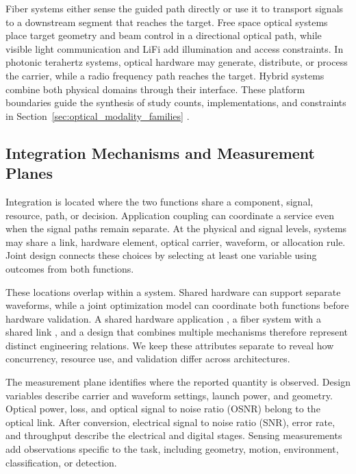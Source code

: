 Fiber systems either sense the guided path directly or use it to transport
signals to a downstream segment that reaches the target. Free space optical
systems place target geometry and beam control in a directional optical path,
while visible light communication and LiFi add illumination and access
constraints. In photonic terahertz systems, optical hardware
may generate, distribute, or process the carrier, while a radio frequency path
reaches the target. Hybrid systems combine both physical domains through their
interface. These platform boundaries guide the synthesis of study counts,
implementations, and constraints in
Section~\ref{sec:optical_modality_families}
\cite{OISAC_SCR00220,OISAC_SCR00940,OISAC_SCR00196,OISAC_SCR00083,
OISAC_SCR00366}.

\subsection{Integration Mechanisms and Measurement Planes}

Integration is located where the two functions share a component, signal,
resource, path, or decision. Application coupling can coordinate a service even
when the signal paths remain separate. At the physical and signal levels,
systems may share a link, hardware element, optical carrier, waveform, or
allocation rule. Joint design connects these choices by selecting at least one
variable using outcomes from both functions.

These locations overlap within a system. Shared hardware can support separate
waveforms, while a joint optimization model can coordinate both functions
before hardware validation. A shared hardware application
\cite{OISAC_SCR00001}, a fiber system with a shared link
\cite{OISAC_SCR00957}, and a design that combines multiple mechanisms
\cite{OISAC_SCR00220} therefore represent distinct engineering relations. We
keep these attributes separate to reveal how concurrency, resource use, and
validation differ across architectures.

The measurement plane identifies where the reported quantity is observed. Design
variables describe carrier and waveform settings, launch power, and geometry.
Optical power, loss, and optical signal to noise ratio (OSNR) belong to the
optical link. After conversion, electrical signal to noise ratio (SNR), error
rate, and throughput describe the electrical and digital stages. Sensing
measurements add observations specific to the task, including geometry, motion, environment,
classification, or detection.

